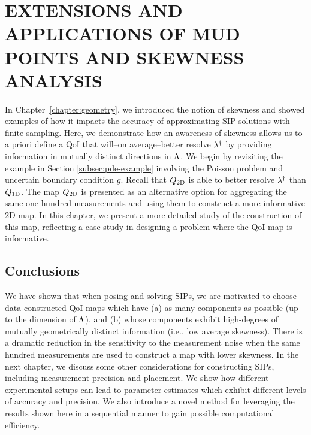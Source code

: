 \chapter{\uppercase{Extensions and Applications of MUD Points and Skewness Analysis} \label{chapter:vector-valued}}

In Chapter~\ref{chapter:geometry}, we introduced the notion of skewness and showed examples of how it impacts the accuracy of approximating SIP solutions with finite sampling.
Here, we demonstrate how an awareness of skewness allows us to a priori define a QoI that will\---on average\---better resolve $\lambda^\dagger$ by providing information in mutually distinct directions in ${\Lambda}$.
We begin by revisiting the example in Section \ref{subsec:pde-example} involving the Poisson problem and uncertain boundary condition $g$.
Recall that $Q_\text{2D}$ is able to better resolve $\lambda^\dagger$ than $Q_\text{1D}$.
The map $Q_\text{2D}$ is presented as an alternative option for aggregating the same one hundred measurements and using them to construct a more informative 2D map.
In this chapter, we present a more detailed study of the construction of this map, reflecting a case-study in designing a problem where the QoI map is informative.


\FloatBarrier

\section{Conclusions}

We have shown that when posing and solving SIPs, we are motivated to choose data-constructed QoI maps which have (a) as many components as possible (up to the dimension of ${\Lambda}$), and (b) whose components exhibit high-degrees of mutually geometrically distinct information (i.e., low average skewness).
There is a dramatic reduction in the sensitivity to the measurement noise when the same hundred measurements are used to construct a map with lower skewness.
In the next chapter, we discuss some other considerations for constructing SIPs, including measurement precision and placement.
We show how different experimental setups can lead to parameter estimates which exhibit different levels of accuracy and precision.
We also introduce a novel method for leveraging the results shown here in a sequential manner to gain possible computational efficiency.
